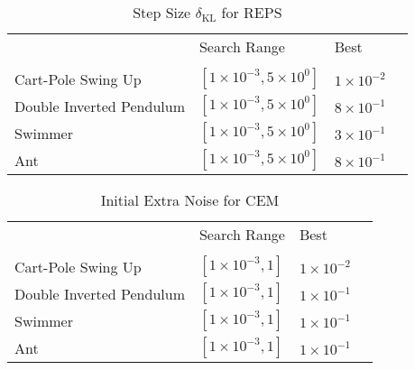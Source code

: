 \documentclass{article}
\begin{document}
\begin{table}[!h]
\centering
\caption{Step Size $\delta_{\text{KL}}$ for REPS}
\label{hyper_reps}
\begin{tabular}{l|lll}
\cline{1-4} \\ [-8pt]
 & Search Range              & Best                 &  \\ [2pt] \cline{1-4} \\ [-8pt]
Cart-Pole Swing Up     & $[1\times 10^{-3}, 5\times 10^0]$            & $1\times 10^{-2}$               &  \\
Double Inverted Pendulum     & $[1\times 10^{-3}, 5\times 10^0]$     & $8 \times 10^{-1}$               &  \\
Swimmer               & $[1\times 10^{-3}, 5\times 10^0]$            & $3 \times 10^{-1}$               &  \\
Ant                   & $[1\times 10^{-3}, 5\times 10^0]$            & $8 \times 10^{-1}$               &  \\ [2pt] \cline{1-4}
\end{tabular}
\end{table}

\begin{table}[!h]
\centering
\caption{Initial Extra Noise for CEM}
\label{hyper_cem}
\begin{tabular}{l|lll}
\cline{1-4} \\ [-8pt]
  & Search Range              & Best                 &  \\ [2pt] \cline{1-4} \\ [-8pt]
Cart-Pole Swing Up     & $[1\times 10^{-3}, 1]$            & $1 \times 10^{-2}$               &  \\
Double Inverted Pendulum     & $[1\times 10^{-3}, 1]$     & $1 \times 10^{-1}$               &  \\
Swimmer               & $[1\times 10^{-3}, 1]$            & $1 \times 10^{-1}$               &  \\
Ant                   & $[1\times 10^{-3}, 1]$            & $1 \times 10^{-1}$               &  \\ [2pt] \cline{1-4}
\end{tabular}
\end{table}
\end{document}
